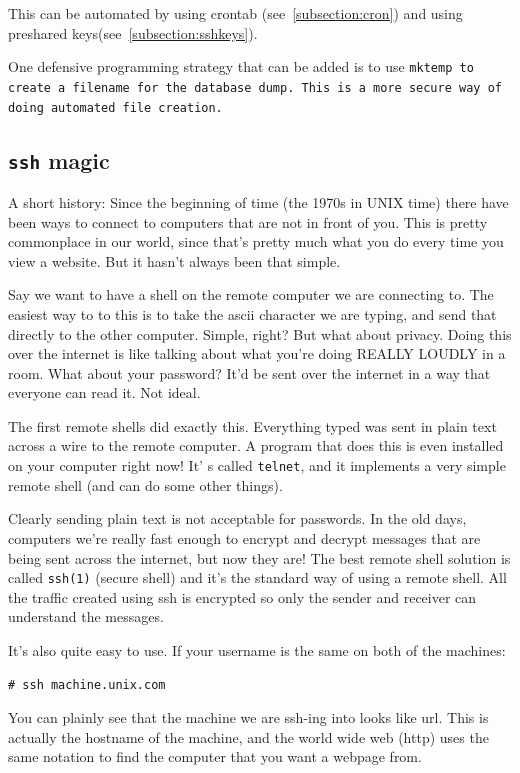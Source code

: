This can be automated by using crontab (see~\ref{subsection:cron}) and
using preshared keys(see~\ref{subsection:sshkeys}). 

One defensive programming strategy that can be added is to use \tt{mktemp} to
create a filename for the database dump. This is a more secure way of doing
automated file creation.  

\subsection {{\tt ssh} magic}

A short history: Since the beginning of time (the 1970s in UNIX time) there have been ways
to connect to computers that are not in front of you. This is pretty commonplace in our world, 
since that's pretty much what you do every time you view a website. But it hasn't 
always been that simple.

Say we want to have a shell on the remote computer we are connecting to. The easiest way 
to to this is to take the ascii character we are typing, and send that directly to the other
computer. Simple, right? But what about privacy. Doing this over the internet is like talking
about what you're doing REALLY LOUDLY in a room. What about your password? It'd be sent over the 
internet in a way that everyone can read it. Not ideal. 

The first remote shells did exactly this. Everything typed was sent in plain text across a wire to 
the remote computer. A program that does this is even installed on your computer right now! It' s
called {\tt telnet}, and it implements a very simple remote shell (and can do some other things).

Clearly sending plain text is not acceptable for passwords. In the old days, computers we're
really fast enough to encrypt and decrypt messages that are being sent across the internet,
but now they are! The best remote shell solution is called {\tt ssh(1)} (secure shell) and it's 
the standard way of using a remote shell. All the traffic created using ssh is encrypted so only the 
sender and receiver can understand
the messages. 

It's also quite easy to use. If your username is the same on both of the machines:

\begin{verbatim}
# ssh machine.unix.com
\end{verbatim}    

You can plainly see that the machine we are ssh-ing into looks like url. This is 
actually the hostname of the machine, and the world wide web (http) uses the same
notation to find the computer that you want a webpage from.

